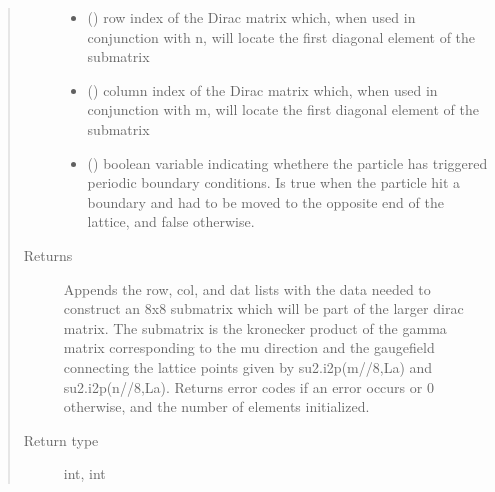 \documentclass[letterpaper,10pt,english]{sphinxmanual}
\begin{document}
\begin{fulllineitems}
\begin{quote}
\begin{description}
\begin{itemize}
\item {} 
 () \textendash{} row index of the Dirac matrix which, when used in conjunction
with n, will locate the first diagonal element of the submatrix

\item {} 
 () \textendash{} column index of the Dirac matrix which, when used in
conjunction with m, will locate the first diagonal element of
the submatrix

\item {} 
 () \textendash{} boolean variable indicating whethere the particle has triggered
periodic boundary conditions. Is true when the particle hit a
boundary and had to be moved to the opposite end of the
lattice, and false otherwise.

\end{itemize}

\item[{Returns}] \leavevmode
Appends the row, col, and dat lists with the data needed to
construct an 8x8 submatrix which will be part of the larger
dirac matrix. The submatrix is the kronecker product of the
gamma matrix corresponding to the mu direction and the
gaugefield connecting the lattice points given by
su2.i2p(m//8,La) and su2.i2p(n//8,La). Returns error codes if
an error occurs or 0 otherwise, and the number of elements
initialized.

\item[{Return type}] \leavevmode
int, int

\end{description}\end{quote}

\end{fulllineitems}

\end{document}
